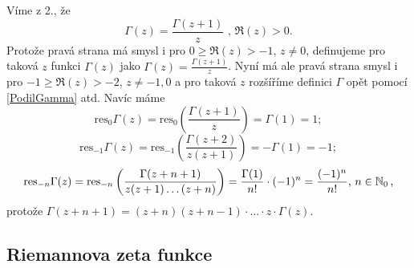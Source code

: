 \begin{enumerate}
    Víme z 2., že
    \begin{equation}\tag{Podíl Gamma}\label{PodilGamma}
        \Gamma(z)=\frac{\Gamma(z+1)}{z}\text{ , } \Re(z)>0 \text{.}
    \end{equation}
    Protože pravá strana má smysl i pro $0 \geq \Re(z)>-1$, $z \neq 0$, definujeme pro taková $z$ funkci $\Gamma (z)$ jako $\Gamma(z)=\frac{\Gamma(z+1)}{z}$.
    Nyní má ale pravá strana smysl i pro $-1 \geq \Re(z)>-2$, $z \neq -1, 0$ a pro taková $z$ rozšíříme definici $\Gamma$ opět pomocí \cref{PodilGamma} atd. Navíc máme
    $$
     \text{res}_{0} \Gamma (z)=\text{res}_{0}\left(\frac{\Gamma (z+1)}{z} \right)=\Gamma(1)=1;
    $$
    $$
     \text{res}_{-1} \Gamma (z)=\text{res}_{-1}\left(\frac{\Gamma (z+2)}{z(z+1)} \right)=-\Gamma(1)=-1;
    $$
     $$
     \text{res}_{-n} \Gamma (z)=\text{res}_{-n}\left(\frac{\Gamma (z+n+1)}{z(z+1)\dots (z+n)} \right)=\frac{\Gamma(1)}{n!}\cdot (-1)^n =\frac{(-1)^n}{n!}\text{, } n \in \operatorname{\mathbb{N}}_0\text{,}
    $$
    protože $\Gamma(z+n+1)=(z+n)(z+n-1) \cdot \dots \cdot z \cdot \Gamma(z)$.
\end{enumerate}

\subsection{Riemannova zeta funkce}
